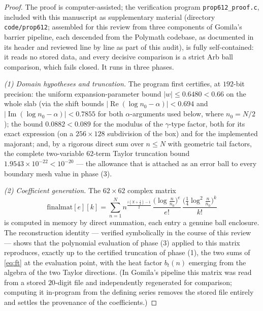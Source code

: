 \documentclass[11pt]{article}
\theoremstyle{definition}
\DeclareMathOperator{\Rea}{Re}
\DeclareMathOperator{\Ima}{Im}
\begin{document}
\begin{proof}
The proof is computer-assisted; the verification program
\texttt{prop612\_proof.c}, included with this manuscript as
supplementary material (directory \texttt{code/prop612}; assembled
for this review from three components of Gomila's barrier pipeline,
each descended from the Polymath codebase, as documented in its
header and reviewed line by line as part of this audit), is fully
self-contained: it reads no stored data, and every decisive
comparison is a strict Arb ball comparison, which fails closed. It
runs in three phases.

\emph{(1) Domain hypotheses and truncation.} The program first
certifies, at $192$-bit precision: the uniform expansion-parameter
bound $|w|\le0.6480<0.66$ on the whole slab (via the shift bounds
$|\Rea(\log n_0-\alpha)|<0.694$ and $|\Ima(\log n_0-\alpha)|<0.7855$
for both $\alpha$-arguments used below, where $n_0=N/2$); the bound
$0.0882<0.089$ for the modulus of the $\gamma$-type factor, both
for its exact expression (on a $256\times128$ subdivision of the
box) and for the implemented majorant; and, by a rigorous direct
sum over $n\le N$ with geometric tail factors, the complete
two-variable $62$-term Taylor truncation bound
$1.9543\times10^{-22}<10^{-20}$ --- the allowance that is attached
as an error ball to every boundary mesh value in phase (3).

\emph{(2) Coefficient generation.} The $62\times62$ complex matrix
\[
\mathrm{finalmat}[e][k]
=\sum_{n=1}^{N}n^{\frac{i(X+\frac12)-1}{2}}
\,\frac{\bigl(\log\frac n{n_0}\bigr)^e}{e!}
\,\frac{\bigl(\frac14\log^2\frac n{n_0}\bigr)^k}{k!}
\]
is computed in memory by direct summation, each entry a genuine
ball enclosure. The reconstruction identity --- verified
symbolically in the course of this review --- shows that the
polynomial evaluation of phase (3) applied to this matrix
reproduces, exactly up to the certified truncation of phase (1),
the two sums of \eqref{eq:ft} at the evaluation point, with the
heat factor $b_t(n)$ emerging from the algebra of the two Taylor
directions. (In Gomila's pipeline this matrix was read from a
stored $20$-digit file and independently regenerated for
comparison; computing it in-program from the defining series
removes the stored file entirely and settles the provenance of the
coefficients.)


\end{proof}
\end{document}
